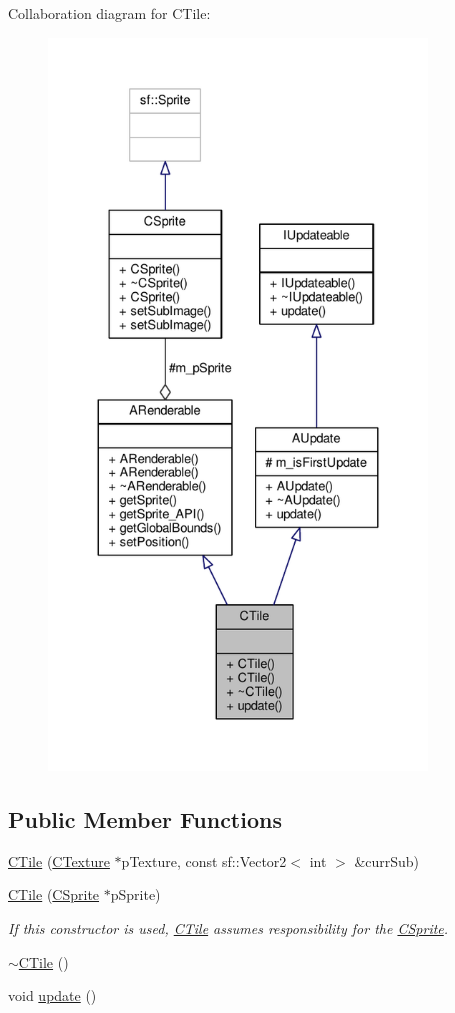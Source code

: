 Collaboration diagram for C\-Tile\-:
\nopagebreak
\begin{figure}[H]
\begin{center}
\leavevmode
\includegraphics[height=550pt]{classCTile__coll__graph}
\end{center}
\end{figure}
\subsection*{Public Member Functions}
\begin{DoxyCompactItemize}
\item 
\hyperlink{classCTile_a030eef2d18fb054c0fa6738784af0b0d}{C\-Tile} (\hyperlink{classCTexture}{C\-Texture} $\ast$p\-Texture, const sf\-::\-Vector2$<$ int $>$ \&curr\-Sub)
\item 
\hyperlink{classCTile_a07c38be9c331480eb7c8d526b084a287}{C\-Tile} (\hyperlink{classCSprite}{C\-Sprite} $\ast$p\-Sprite)
\begin{DoxyCompactList}\small\item\em If this constructor is used, \hyperlink{classCTile}{C\-Tile} assumes responsibility for the \hyperlink{classCSprite}{C\-Sprite}. \end{DoxyCompactList}\item 
\hyperlink{classCTile_ac57f4f936e612edf8fc825d91912640a}{$\sim$\-C\-Tile} ()
\item 
void \hyperlink{classCTile_a818a17e48a7219eedac950b82c641ee0}{update} ()
\end{DoxyCompactItemize}
